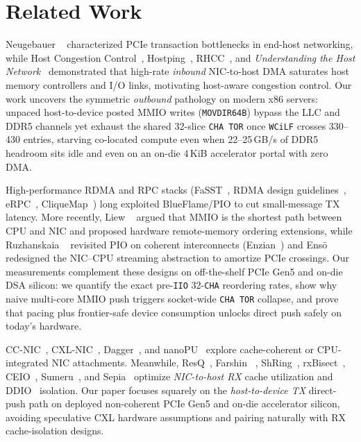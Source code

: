 \section{Related Work}
\label{sec:related}

Neugebauer \etal{}~\cite{neugebauer2018pcie} characterized PCIe transaction bottlenecks in end-host networking, while Host Congestion Control~\cite{agarwal2023hostcc}, Hostping~\cite{liu2023hostping}, RHCC~\cite{wan2025rhcc}, and \emph{Understanding the Host Network}~\cite{vuppalapati2024hostnet} demonstrated that high-rate \emph{inbound} NIC-to-host DMA saturates host memory controllers and I/O links, motivating host-aware congestion control. Our work uncovers the symmetric \emph{outbound} pathology on modern x86 servers: unpaced host-to-device posted MMIO writes (\texttt{MOVDIR64B}) bypass the LLC and DDR5 channels yet exhaust the shared 32-slice \texttt{CHA TOR} once \texttt{WCiLF} crosses 330--430 entries, starving co-located compute even when 22--25\,GB/s of DDR5 headroom sits idle and even on an on-die 4\,KiB accelerator portal with zero DMA.

High-performance RDMA and RPC stacks (FaSST~\cite{kalia2016fasst}, RDMA design guidelines~\cite{kalia2016rdma}, eRPC~\cite{kalia2019erpc}, CliqueMap~\cite{singhvi2021cliquemap}) long exploited BlueFlame/PIO to cut small-message TX latency. More recently, Liew \etal{}~\cite{liew2025hotos,liew2026asplos} argued that MMIO is the shortest path between CPU and NIC and proposed hardware remote-memory ordering extensions, while Ruzhanskaia \etal{}~\cite{ruzhanskaia2024pio} revisited PIO on coherent interconnects (Enzian~\cite{cock2022enzian}) and Ens\={o}~\cite{sadok2023enso} redesigned the NIC--CPU streaming abstraction to amortize PCIe crossings. Our measurements complement these designs on off-the-shelf PCIe Gen5 and on-die DSA silicon: we quantify the exact pre-\texttt{IIO} 32-\texttt{CHA} reordering rates, show why naive multi-core MMIO push triggers socket-wide \texttt{CHA TOR} collapse, and prove that pacing plus frontier-safe device consumption unlocks direct push safely on today's hardware.

CC-NIC~\cite{schuh2024ccnic}, CXL-NIC~\cite{cxlnic2025}, Dagger~\cite{lazarev2021dagger}, and nanoPU~\cite{ibanez2021nanopu} explore cache-coherent or CPU-integrated NIC attachments. Meanwhile, ResQ~\cite{tootoonchian2018resq}, Farshin \etal{}~\cite{farshin2020ddio}, ShRing~\cite{pismenny2023shring}, rxBisect~\cite{pismenny2025rxbisect}, CEIO~\cite{liu2025ceio}, Sumeru~\cite{wang2026sumeru}, and Sepia~\cite{song2026sepia} optimize \emph{NIC-to-host RX} cache utilization and DDIO~\cite{intelddio} isolation. Our paper focuses squarely on the \emph{host-to-device TX} direct-push path on deployed non-coherent PCIe Gen5 and on-die accelerator silicon, avoiding speculative CXL hardware assumptions and pairing naturally with RX cache-isolation designs.

